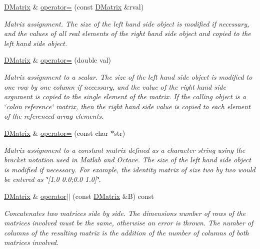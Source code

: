 \begin{DoxyCompactItemize}
\hyperlink{classDMatrix}{DMatrix} \& \hyperlink{classDMatrix_add548c8713cb71b189a0535d05a37cc9}{operator=} (const \hyperlink{classDMatrix}{DMatrix} \&rval)
\begin{DoxyCompactList}\small\item\em Matrix assignment. The size of the left hand side object is modified if necessary, and the values of all real elements of the right hand side object and copied to the left hand side object. \item\end{DoxyCompactList}\item 
\hyperlink{classDMatrix}{DMatrix} \& \hyperlink{classDMatrix_af94a79c28f61abb7ef91c97a5113f2d4}{operator=} (double val)
\begin{DoxyCompactList}\small\item\em Matrix assignment to a scalar. The size of the left hand side object is modified to one row by one column if necessary, and the value of the right hand side argument is copied to the single element of the matrix. If the calling object is a \char`\"{}colon reference\char`\"{} matrix, then the right hand side value is copied to each element of the referenced array elements. \item\end{DoxyCompactList}\item 
\hyperlink{classDMatrix}{DMatrix} \& \hyperlink{classDMatrix_a5625e608ef4e437bdce83858df5b3c97}{operator=} (const char $\ast$str)
\begin{DoxyCompactList}\small\item\em Matrix assignment to a constant matrix defined as a character string using the bracket notation used in Matlab and Octave. The size of the left hand side object is modified if necessary. For example, the identity matrix of size two by two would be entered as \char`\"{}\mbox{[}1.0  0.0;0.0  1.0\mbox{]}\char`\"{}. \item\end{DoxyCompactList}\item 
\hyperlink{classDMatrix}{DMatrix} \& \hyperlink{classDMatrix_a7b756f28bc990d6b5b67a176143b9fc0}{operator$|$$|$} (const \hyperlink{classDMatrix}{DMatrix} \&B) const 
\begin{DoxyCompactList}\small\item\em Concatenates two matrices side by side. The dimensions number of rows of the matrices involved must be the same, otherwise an error is thrown. The number of columns of the resulting matrix is the addition of the number of columns of both matrices involved. \item\end{DoxyCompactList}\item 

\end{DoxyCompactItemize}
